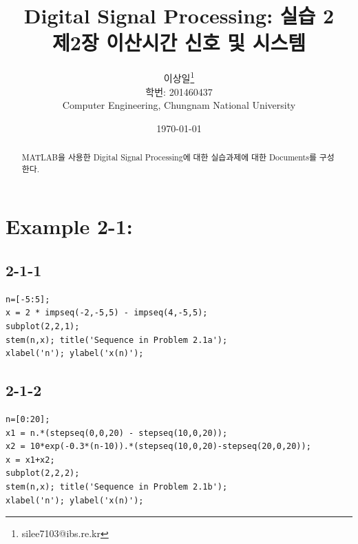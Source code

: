 \documentclass[11pt
  , a4paper
  , article
  , oneside
]{memoir}
\begin{document}
\newcommand{\technumber}{
  Digital Signal Processing using MATLAB\\
  Document 1: 2016-03-26}
\title{\textbf{Digital Signal Processing: 실습 2 \\
		제2장 이산시간 신호 및 시스템 \\}}

\author{이상일\thanks{silee7103@ibs.re.kr} \\

  학번: 201460437\\
  Computer Engineering, Chungnam National University 
}
\date{\today}

\renewcommand{\maketitlehooka}{\begin{flushright}\textsf{\technumber}\end{flushright}}

\maketitle

\begin{abstract}
MATLAB을 사용한 Digital Signal Processing에 대한 실습과제에 대한 Documents를 구성한다.
\end{abstract}

\chapter{Example 2-1:}

\section{2-1-1}

\begin{lstlisting}[style=termstyle]
n=[-5:5];
x = 2 * impseq(-2,-5,5) - impseq(4,-5,5);
subplot(2,2,1);
stem(n,x); title('Sequence in Problem 2.1a');
xlabel('n'); ylabel('x(n)');
\end{lstlisting}

\section{2-1-2}

\begin{lstlisting}[style=termstyle]
n=[0:20];
x1 = n.*(stepseq(0,0,20) - stepseq(10,0,20));
x2 = 10*exp(-0.3*(n-10)).*(stepseq(10,0,20)-stepseq(20,0,20));
x = x1+x2;
subplot(2,2,2);
stem(n,x); title('Sequence in Problem 2.1b');
xlabel('n'); ylabel('x(n)');
\end{lstlisting}
\end{document}

